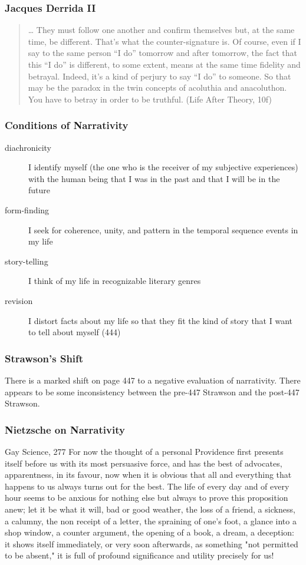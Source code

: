 \documentclass[xcolor=dvipsnames]{beamer}
\begin{document}
\begin{frame}
  \frametitle{Jacques Derrida II}
  \begin{quote}
    {\ldots} They must follow one another and confirm themselves but,
    at the same time, be different. That's what the counter-signature
    is. Of course, even if I say to the same person ``I do'' tomorrow
    and after tomorrow, the fact that this ``I do'' is different, to
    some extent, means at the same time fidelity and betrayal. Indeed,
    it's a kind of perjury to say ``I do'' to someone. So that may be
    the paradox in the twin concepts of acoluthia and anacoluthon. You
    have to betray in order to be truthful. (Life After Theory, 10f)
  \end{quote}
\end{frame}

\begin{frame}
  \frametitle{Conditions of Narrativity}
  \begin{description}
  \item[diachronicity] I identify myself (the one who is the receiver
    of my subjective experiences) with the human being that I was in
    the past and that I will be in the future
  \item[form-finding] I seek for coherence, unity, and pattern in the
    temporal sequence events in my life
  \item[story-telling] I think of my life in recognizable literary
    genres
  \item[revision] I distort facts about my life so that they fit the
    kind of story that I want to tell about myself (444)
  \end{description}
\end{frame}

\begin{frame}
  \frametitle{Strawson's Shift}
  There is a marked shift on page 447 to a negative evaluation of
  narrativity. There appears to be some inconsistency between the
  pre-447 Strawson and the post-447 Strawson.
\end{frame}

\begin{frame}
  \frametitle{Nietzsche on Narrativity}
  \begin{block}{Gay Science, 277}
    For now the thought of a personal Providence first presents itself
    before us with its most persuasive force, and has the best of
    advocates, apparentness, in its favour, now when it is obvious
    that all and everything that happens to us always turns out for
    the best. The life of every day and of every hour seems to be
    anxious for nothing else but always to prove this proposition
    anew; let it be what it will, bad or good weather, the loss of a
    friend, a sickness, a calumny, the non receipt of a letter, the
    spraining of one's foot, a glance into a shop window, a counter
    argument, the opening of a book, a dream, a deception: it shows
    itself immediately, or very soon afterwards, as something "not
    permitted to be absent," it is full of profound significance and
    utility precisely for us!
  \end{block}
\end{frame}
\end{document}

